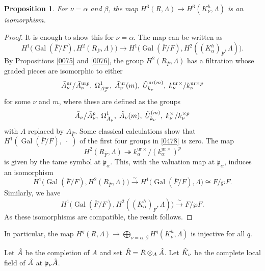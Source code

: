 \documentclass{amsart}
\newtheorem{Prop}[Thm]{Proposition}
\theoremstyle{remark}
\numberwithin{equation}{subsection}
\newcommand{\onto}{\twoheadrightarrow}
\newcommand{\isomto}{\overset{\sim}{\to}}
\newcommand{\tensor}{\mathbin{\otimes}}
\newcommand{\closure}[1]{\overline{#1}}
\newcommand{\ur}{\mathrm{ur}}
\newcommand{\var}{\;\cdot\;}
\newcommand{\ideal}[1]{\mathfrak{#1}}
\DeclareMathOperator{\Gal}{Gal}
\begin{document}
\begin{Prop} \label{0077}
	For $\nu = \alpha$ and $\beta$,
	the map $H^{3}(R, \Lambda) \to H^{3}(K_{\nu}^{h}, \Lambda)$
	is an isomorphism.
\end{Prop}

\begin{proof}
	It is enough to show this for $\nu = \alpha$.
	The map can be written as
		\[
				H^{1} \bigl(
					\Gal(\closure{F} / F),
					H^{2}(R_{\closure{F}}, \Lambda)
				\bigr)
			\to
				H^{1} \bigl(
					\Gal(\closure{F} / F),
					H^{2}((K_{\alpha}^{h})_{\closure{F}}, \Lambda)
				\bigr).
		\]
	By Propositions \ref{0075}
	and \ref{0076},
	the group $H^{2}(R_{\closure{F}}, \Lambda)$ has a filtration
	whose graded pieces are isomorphic to either
		\begin{equation} \label{0478}
			\Bar{A}_{\nu}^{\ur} / \Bar{A}_{\nu}^{\ur p},\;
			\Omega_{\Bar{A}_{\nu}^{\ur}}^{1},\;
			\Tilde{A}_{\nu}^{\ur}(m),\;
			\Tilde{U}_{k_{\nu}}^{\ur (m)},\;
			k_{\nu}^{\ur \times} / k_{\nu}^{\ur \times p}
		\end{equation}
	for some $\nu$ and $m$, where these are defined as the groups
		\[
			\Bar{A}_{\nu} / \Bar{A}_{\nu}^{p},\;
			\Omega_{\Bar{A}_{\nu}}^{1},\;
			\Tilde{A}_{\nu}(m),\;
			\Tilde{U}_{k_{\nu}}^{(m)},\;
			k_{\nu}^{\times} / k_{\nu}^{\times p}
		\]
	with $A$ replaced by $A_{\closure{F}}$.
	Some classical calculations show that
	$H^{1}(\Gal(\closure{F} / F), \var)$ of the first four groups in \eqref{0478} is zero.
	The map
		\[
				H^{2}(R_{\closure{F}}, \Lambda)
			\onto
					k_{\alpha}^{\ur \times}
				/
					(k_{\alpha}^{\ur \times})^{p}
		\]
	is given by the tame symbol at $\ideal{p}_{\alpha}$.
	This, with the valuation map at $\ideal{p}_{\alpha}$, induces an isomorphism
		\[
				H^{1} \bigl(
					\Gal(\closure{F} / F),
					H^{2}(R_{\closure{F}}, \Lambda)
				\bigr)
			\isomto
				H^{1} \bigl(
					\Gal(\closure{F} / F),
					\Lambda
				\bigr)
			\cong
				F / \wp F.
		\]
	Similarly, we have
		\[
				H^{1} \bigl(
					\Gal(\closure{F} / F),
					H^{2}((K_{\alpha}^{h})_{\closure{F}}, \Lambda)
				\bigr)
			\isomto
				F / \wp F.
		\]
	As these isomorphisms are compatible,
	the result follows.
\end{proof}

In particular, the map
$H^{q}(R, \Lambda) \to \bigoplus_{\nu = \alpha, \beta} H^{q}(K_{\nu}^{h}, \Lambda)$
is injective for all $q$.

Let $\Hat{A}$ be the completion of $A$ and set $\Hat{R} = R \tensor_{A} \Hat{A}$.
Let $\Hat{K}_{\nu}$ be the complete local field of $\Hat{A}$ at $\ideal{p}_{\nu} \Hat{A}$.
\end{document}
